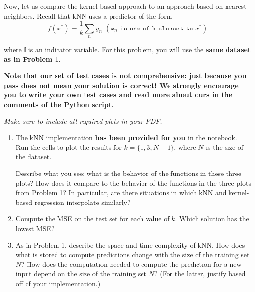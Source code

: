 \documentclass[submit]{harvardml}
\begin{document}
\newpage
\begin{problem}

Now, let us compare the kernel-based approach to an approach based on
nearest-neighbors.  Recall that kNN uses a predictor of the form
  \begin{equation*}
    f(x^*) = \frac{1}{k} \sum_n y_n \mathbb{I}(x_n \texttt{ is one of k-closest to } x^*)
  \end{equation*}

\noindent where $\mathbb{I}$ is an indicator variable. For this problem, you will use the \textbf{same dataset as in Problem 1}.



\textbf{Note that our set of test cases is not comprehensive: just because you pass does not mean your solution is correct! We strongly encourage you to write your own test cases and read more about ours in the comments of the Python script.}

\vspace{0.5cm}
\noindent\emph{Make sure to include all required plots in your PDF.}


\begin{enumerate}

\item The kNN implementation \textbf{has been provided for you} in the notebook. Run the cells to plot the results for $k=\{1, 3, N-1\}$, where $N$ is the size of the dataset.

  Describe what you see: what is the behavior of the functions in
  these three plots?  How does it compare to the behavior of the
  functions in the three plots from Problem 1? In particular, are
  there situations in which kNN and kernel-based regression
  interpolate similarly?

\item Compute the MSE on the test set for each value of $k$.  Which solution has the lowest MSE?  

\item As in Problem 1, describe the space and time complexity of kNN.  How does what is stored to compute predictions change with the size of the training set $N$?  How does the computation needed to compute the prediction for a new input depend on the size of the training set $N$? (For the latter, justify based off of your implementation.)

\end{enumerate}

\end{problem}
\end{document}
